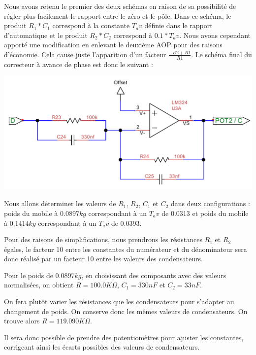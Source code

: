 \documentclass[11pt, french]{article} %
\begin{document}
\vspace{0.5cm}

Nous avons retenu le premier des deux schémas en raison de sa possibilité de régler plus facilement le rapport entre le zéro et le pôle. Dans ce schéma, le produit $R_1*C_1$ correspond à la constante $ T_av$ définie dans le rapport d'automatique et le produit $R_2*C_2$ correspond à $0.1*T_av$. Nous avons cependant apporté une modification en enlevant le deuxième AOP pour des raisons d'économie. Cela cause juste l'apparition d'un facteur $\frac{-R2+R1}{R1}$. Le schéma final du correcteur à avance de phase est donc le suivant :

\begin{center}
\includegraphics[width = 15cm]{SolutionAnalogique/AvPhase.pdf}
\end{center}


Nous allons déterminer les valeurs de $R_1$, $R_2$, $C_1$ et $C_2$ dans deux configurations : poids du mobile à $0.0897 kg$ correspondant à un $T_av$ de 0.0313 et poids du mobile à $0.1414 kg$ correspondant à un $T_av$ de 0.0393.


Pour des raisons de simplifications, nous prendrons les résistances $R_1$ et $R_2$ égales, le facteur 10 entre les constantes du numérateur et du dénominateur sera donc réalisé par un facteur 10 entre les valeurs des condensateurs. 


Pour le poids de $0.0897 kg$, en choisissant des composants avec des valeurs normalisées, on obtient $R=100.0 K\Omega$, $C_1=330 nF$ et $C_2=33 nF$. 


On fera plutôt varier les résistances que les condensateurs pour s'adapter au changement de poids. On conserve donc les mêmes valeurs de condensateurs. On trouve alors $R=119.090 K\Omega$. 


Il sera donc possible de prendre des potentiomètres pour ajuster les constantes, corrigeant ainsi les écarts possibles des valeurs de condensateurs. 
\end{document}
